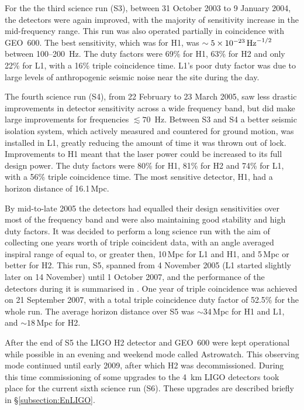 \documentclass{article}
\begin{document}
For the the third science run (S3), between 31 October 2003 to 9 January 2004,
the detectors were again improved, with the majority of sensitivity increase in
the mid-frequency range. This run was also operated partially in coincidence
with GEO~600. The best sensitivity, which was for H1, was
$\sim5\times10^{-23}\,{\rm Hz}^{-1/2}$ between 100--200~Hz. The duty factors
were 69\% for H1, 63\% for H2 and only 22\% for L1, with a 16\% triple
coincidence time. L1's poor duty factor was due to large levels of anthropogenic
seismic noise near the site during the day.

The fourth science run (S4), from 22 February to 23 March 2005, saw less drastic
improvements in detector sensitivity across a wide frequency band, but did make
large improvements for frequencies $\lesssim 70$~Hz. Between S3 and S4 a better 
seismic isolation system, which actively measured and countered for ground
motion, was installed in L1, greatly reducing the amount of time
it was thrown out of lock. Improvements to H1 meant that the laser power
could be increased to its full design power. The duty factors were 80\% for H1,
81\% for H2 and 74\% for L1, with a 56\% triple coincidence time. The most
sensitive detector, H1, had a horizon distance of 16.1\,Mpc.

By mid-to-late 2005 the detectors had equalled their design sensitivities over
most of the frequency band and were also maintaining good stability and high
duty factors. It was decided to perform a long science run with the aim of
collecting one years worth of triple coincident data, with an angle averaged
inspiral range of equal to, or greater then, 10\,Mpc for L1 and H1, and 5\,Mpc
or better for H2. This run, S5, spanned from 4 November 2005 (L1 started
slightly later on 14 November) until 1 October 2007, and the performance of the
detectors during it is summarised in \cite{LIGOS5}. One year of triple
coincidence was achieved on 21 September 2007, with a total triple coincidence
duty factor of 52.5\% for the whole run. The average horizon distance over S5
was $\sim$34\,Mpc for H1 and L1, and $\sim18$\,Mpc for H2.

After the end of S5 the LIGO H2 detector and GEO~600 were kept operational
while possible in an evening and weekend mode called Astrowatch. This
observing mode continued until early 2009, after which H2 was decommissioned.
During this time commissioning of some upgrades to the 4~km LIGO detectors took
place for the current sixth science run (S6). These upgrades are described 
briefly in \S\ref{subsection:EnLIGO}.
\end{document}
